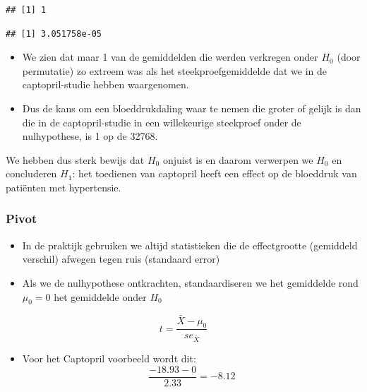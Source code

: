 \documentclass[
  12pt,dutch]{book}
\newenvironment{Shaded}{\begin{snugshade}}{\end{snugshade}}
\newcommand{\FunctionTok}[1]{\textcolor[rgb]{0.13,0.29,0.53}{\textbf{#1}}}
\newcommand{\NormalTok}[1]{#1}
\newcommand{\SpecialCharTok}[1]{\textcolor[rgb]{0.81,0.36,0.00}{\textbf{#1}}}
\providecommand{\tightlist}{%
  \setlength{\itemsep}{0pt}\setlength{\parskip}{0pt}}
\theoremstyle{definition}
\theoremstyle{definition}
\theoremstyle{definition}
\theoremstyle{definition}
\theoremstyle{remark}
\begin{document}
\begin{verbatim}
## [1] 1
\end{verbatim}

\begin{Shaded}
\end{Shaded}

\begin{verbatim}
## [1] 3.051758e-05
\end{verbatim}

\begin{itemize}
\item
  We zien dat maar 1 van de gemiddelden die werden verkregen onder \(H_0\) (door permutatie) zo extreem was als het steekproefgemiddelde dat we in de captopril-studie hebben waargenomen.
\item
  Dus de kans om een bloeddrukdaling waar te nemen die groter of gelijk is dan die in de captopril-studie in een willekeurige steekproef onder de nulhypothese, is 1 op de 32768.
\end{itemize}

We hebben dus sterk bewijs dat \(H_0\) onjuist is en daarom verwerpen we \(H_0\) en concluderen \(H_1\): het toedienen van captopril heeft een effect op de bloeddruk van patiënten met hypertensie.

\subsubsection{Pivot}\label{pivot}

\begin{itemize}
\item
  In de praktijk gebruiken we altijd statistieken die de effectgrootte (gemiddeld verschil) afwegen tegen ruis (standaard error)
\item
  Als we de nulhypothese ontkrachten, standaardiseren we het gemiddelde rond \(\mu_0 = 0\) het gemiddelde onder \(H_0\)
\end{itemize}

\[t=\frac{\bar X-\mu_0}{se_{\bar X}}\]

\begin{itemize}
\tightlist
\item
  Voor het Captopril voorbeeld wordt dit:
  \[\frac{-18.93-0}{2.33}=-8.12\]
\end{itemize}
\end{document}

